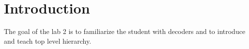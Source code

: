 \section{Introduction}\label{sec: Introduction}
The goal of the lab 2 is to familiarize the student with decoders and to introduce and teach top level hierarchy.
